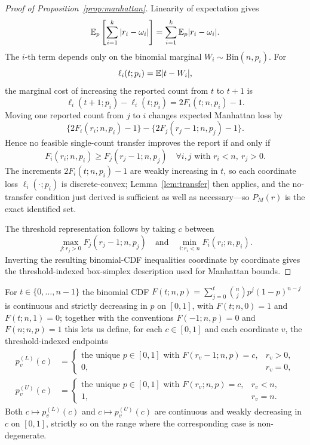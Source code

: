 \begin{proof}[Proof of Proposition~\ref{prop:manhattan}]
Linearity of expectation gives
\[
\mathbb{E}_p\left[\sum_{i=1}^k |r_i-\omega_i|\right]
=
\sum_{i=1}^k \mathbb{E}_p|r_i-\omega_i|.
\]
The \(i\)-th term depends only on the binomial marginal \(W_i\sim\mathrm{Bin}(n,p_i)\).
For
\[
\ell_i(t;p_i)=\mathbb{E}|t-W_i|,
\]
the marginal cost of increasing the reported count from \(t\) to \(t+1\) is
\[
\ell_i(t+1;p_i)-\ell_i(t;p_i)
=
2F_i(t;n,p_i)-1.
\]
Moving one reported count from \(j\) to \(i\) changes expected Manhattan loss by
\[
\{2F_i(r_i;n,p_i)-1\}-\{2F_j(r_j-1;n,p_j)-1\}.
\]
Hence no feasible single-count transfer improves the report if and only if
\[
F_i(r_i;n,p_i)\ge F_j(r_j-1;n,p_j)
\quad
\forall i,j\text{ with }r_i<n,\ r_j>0.
\]
The increments \(2F_i(t;n,p_i)-1\) are weakly increasing in \(t\), so each coordinate loss \(\ell_i(\cdot;p_i)\) is discrete-convex; Lemma~\ref{lem:transfer} then applies, and the no-transfer condition just derived is sufficient as well as necessary---so \(P_M(r)\) is the exact identified set.

The threshold representation follows by taking \(c\) between
\[
\max_{j:r_j>0}F_j(r_j-1;n,p_j)
\quad\text{and}\quad
\min_{i:r_i<n}F_i(r_i;n,p_i).
\]
Inverting the resulting binomial-CDF inequalities coordinate by coordinate gives the threshold-indexed box-simplex description used for Manhattan bounds.
\end{proof}

For \(t\in\{0,\dots,n-1\}\) the binomial CDF \(F(t;n,p)=\sum_{j=0}^t\binom{n}{j}p^j(1-p)^{n-j}\) is continuous and strictly decreasing in \(p\) on \([0,1]\), with \(F(t;n,0)=1\) and \(F(t;n,1)=0\); together with the conventions \(F(-1;n,p)=0\) and \(F(n;n,p)=1\) this lets us define, for each \(c\in[0,1]\) and each coordinate \(v\), the threshold-indexed endpoints
\begin{align*}
p_v^{(L)}(c)&=
\begin{cases}
\text{the unique }p\in[0,1]\text{ with }F(r_v-1;n,p)=c, & r_v>0,\\
0, & r_v=0,
\end{cases}\\
p_v^{(U)}(c)&=
\begin{cases}
\text{the unique }p\in[0,1]\text{ with }F(r_v;n,p)=c, & r_v<n,\\
1, & r_v=n.
\end{cases}
\end{align*}
Both \(c\mapsto p_v^{(L)}(c)\) and \(c\mapsto p_v^{(U)}(c)\) are continuous and weakly decreasing in \(c\) on \([0,1]\), strictly so on the range where the corresponding case is non-degenerate.

